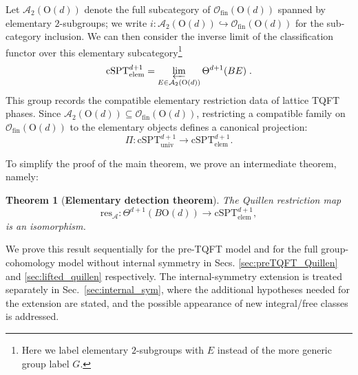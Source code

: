\documentclass[aps,prx,reprint,superscriptaddress,twocolumn,amsmath,amssymb,amsfonts, nofootinbib]{revtex4-2}
\newcommand{\ofin}{\mathcal{O}_{\text{fin}}}
\newcommand{\res}{\text{res}}
\theoremstyle{apsstyle}
\newtheorem{theorem}{Theorem}[section]
\begin{document}
Let $\mathcal{A}_{2}(\mathrm{O}(d))$ denote the full subcategory of $\ofin(\mathrm{O}(d))$ spanned by elementary $2$-subgroups; we write $i: \mathcal{A}_{2}(\mathrm{O}(d)) \hookrightarrow \mathcal{O}_{\mathrm{fin}}(\mathrm{O}(d))$ for the sub-category inclusion. We can then consider the inverse limit of the classification functor over this elementary subcategory\footnote{Here we label elementary $2$-subgroups with $E$ instead of the more generic group label $G.$}
\begin{equation*}\mathrm{cSPT}^{d+1}_{\mathrm{elem}}= \varprojlim_{E\in \mathcal{A}_{2}(\mathrm{O}(d))} \Theta^{d+1}(BE)\;.
\end{equation*}
This group records the compatible elementary restriction data of lattice TQFT phases. Since $\mathcal{A}_{2}(\mathrm{O}(d)) \subseteq \mathcal{O}_{\mathrm{fin}}(\mathrm{O}(d))$, restricting a compatible family on $\mathcal{O}_{\mathrm{fin}}(\mathrm{O}(d))$ to the elementary objects defines a canonical projection: 
\begin{equation*}
\Pi: \mathrm{cSPT}^{d+1}_{\mathrm{univ}} \to \mathrm{cSPT}^{d+1}_{\mathrm{elem}}.
\end{equation*}

\bigskip 

To simplify the proof of the main theorem, we prove an intermediate theorem, namely:

\medskip

\begin{theorem}[{\bf Elementary detection theorem}]
\label{theorem:intermediate}
The Quillen restriction map 
\begin{equation}
\res_{\mathcal{A}}:\Theta^{d+1}(B\mathrm{O}(d)) \to \mathrm{cSPT}^{d+1}_{\mathrm{elem}},
\label{eq:quillen_isom}
\end{equation}
is an isomorphism. 
\end{theorem}

\medskip

We prove this result sequentially for the pre-TQFT model and for the full group-cohomology model without internal symmetry in Secs. \ref{sec:preTQFT_Quillen} and \ref{sec:lifted_quillen} respectively. The internal-symmetry extension is treated separately in Sec.~\ref{sec:internal_sym}, where the additional hypotheses needed for the extension are stated, and the possible appearance of new integral/free classes is addressed. 

\bigskip 
\end{document}
